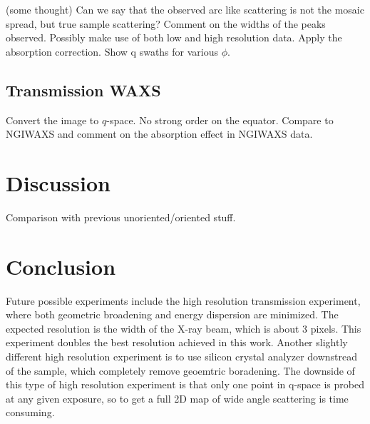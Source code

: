 (some thought) Can we say that
the observed arc like scattering is not the mosaic spread, but
true sample scattering? Comment on the widths of the peaks observed.
Possibly make use of both low and high resolution data.
Apply the absorption correction. Show q swaths for various $\phi$.

\subsection{Transmission WAXS}
Convert the image to $q$-space.
No strong order on the equator. 
Compare to NGIWAXS and comment on the absorption effect
in NGIWAXS data.

\section{Discussion}
Comparison with previous unoriented/oriented stuff.

\section{Conclusion}
Future possible experiments
include the high resolution transmission experiment, where both geometric 
broadening and energy dispersion are minimized. The expected resolution 
is the width of the X-ray beam, which is about 3 pixels. This experiment 
doubles the best resolution achieved in this work. 
Another slightly different high resolution experiment is to use silicon 
crystal analyzer downstread of the sample, which completely remove geoemtric
boradening. The downside of this type of high resolution experiment is that
only one point in q-space is probed at any given exposure, so to get a full
2D map of wide angle scattering is time consuming.  
